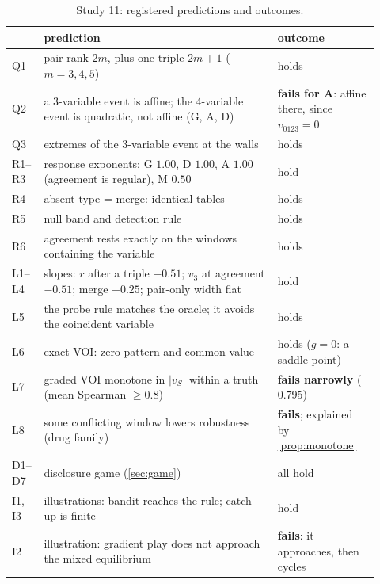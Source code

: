 \documentclass[11pt]{article}
\theoremstyle{definition}\newtheorem{definition}{Definition}\newtheorem{remark}{Remark}
\begin{document}
\begin{table}[!htbp]\centering\small
\begin{tabular}{p{0.06\linewidth}p{0.6\linewidth}p{0.26\linewidth}}\toprule
& prediction & outcome\\\midrule
Q1 & pair rank $2m$, plus one triple $2m+1$ ($m=3,4,5$) & holds\\
Q2 & a 3-variable event is affine; the 4-variable event is quadratic, not affine (G, A, D) & \textbf{fails for A}: affine there, since $v_{0123}=0$\\
Q3 & extremes of the 3-variable event at the walls & holds\\
R1--R3 & response exponents: G $1.00$, D $1.00$, A $1.00$ (agreement is regular), M $0.50$ & hold\\
R4 & absent type = merge: identical tables & holds\\
R5 & null band and detection rule & holds\\
R6 & agreement rests exactly on the windows containing the variable & holds\\
L1--L4 & slopes: $r$ after a triple $-0.51$; $v_3$ at agreement $-0.51$; merge $-0.25$; pair-only width flat & hold\\
L5 & the probe rule matches the oracle; it avoids the coincident variable & holds\\
L6 & exact VOI: zero pattern and common value & holds ($g=0$: a saddle point)\\
L7 & graded VOI monotone in $|v_S|$ within a truth (mean Spearman $\ge0.8$) & \textbf{fails narrowly} ($0.795$)\\
L8 & some conflicting window lowers robustness (drug family) & \textbf{fails}; explained by \cref{prop:monotone}\\
D1--D7 & disclosure game (\cref{sec:game}) & all hold\\\midrule
I1, I3 & illustrations: bandit reaches the rule; catch-up is finite & hold\\
I2 & illustration: gradient play does not approach the mixed equilibrium & \textbf{fails}: it approaches, then cycles\\\bottomrule
\end{tabular}
\caption{Study 11: registered predictions and outcomes.}\label{tab:study}
\end{table}
\end{document}
